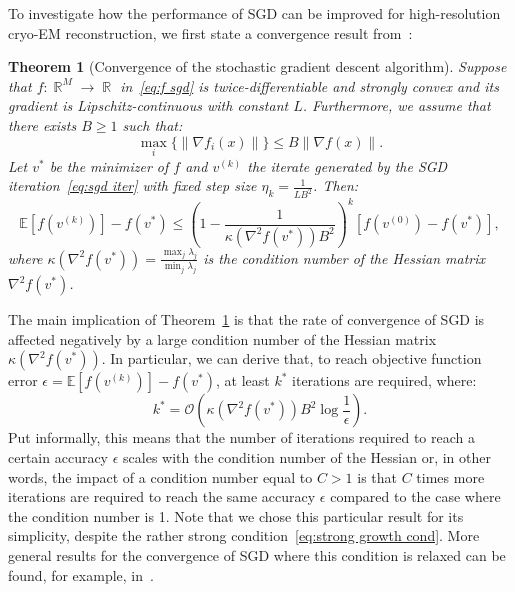 \documentclass{article}
\DeclareMathOperator{\Rb}{\mathbb{R}}
\newtheorem{theorem}{Theorem}[section]
\begin{document}
To investigate how the performance of SGD can be improved for high-resolution
cryo-EM reconstruction, we first state a convergence result from~\cite{schmidt_fast_2013}:
\begin{theorem}[Convergence of the stochastic gradient descent algorithm]
    Suppose that $f: \Rb^M \to \Rb$ in~\eqref{eq:f sgd} is twice-differentiable
    and strongly convex and its gradient is Lipschitz-continuous with constant $L$.
    Furthermore, we assume that there exists $B \geq 1$ such that:
    \begin{equation}
        \max_i \{ \|\nabla f_i(x) \| \} \leq B \| \nabla f(x) \|.
        \label{eq:strong growth cond}
    \end{equation}
    Let $v^*$ be the minimizer of $f$ and $v^{(k)}$ the iterate generated
    by the SGD iteration~\eqref{eq:sgd iter} with fixed step size $\eta_k = \frac{1}{LB^2}$. 
    Then:
    $$
    \mathbb{E}\left[ f(v^{(k)}) \right] - f(v^*) \leq
    \left(1 - \frac{1}{\kappa(\nabla^2 f(v^*)) B^2} \right)^k
    \left[ f(v^{(0)}) - f(v^*)  \right],
    $$
    where $ \kappa(\nabla^2 f(v^*)) = \frac{\max_j \lambda_j}{\min_j \lambda_j}$
    is the condition number of the Hessian matrix $\nabla^2 f(v^*)$. 
    \label{thm:sgd convergence}
\end{theorem}
The main implication of Theorem~\ref{thm:sgd convergence} is that the rate of 
convergence of SGD is affected negatively by a large condition number of the 
Hessian matrix $\kappa(\nabla^2 f(v^*))$.
In particular, we can derive that, 
to reach objective function error 
$\epsilon = \mathbb{E}\left[ f(v^{(k)}) \right] - f(v^*)$,
at least $k^*$ iterations are required, where:
\begin{equation}
    k^* = \mathcal{O}\left(
        \kappa(\nabla^2 f(v^*)) B^2 \log\frac{1}{\epsilon}
    \right).
    \label{eq:min iters}
\end{equation}
Put informally, this means that the number of iterations required to reach a certain accuracy $\epsilon$ scales with the condition number of the Hessian or, in other words, the impact of a condition number equal to $C > 1$ is that $C$ times more iterations are required to reach the same accuracy $\epsilon$ compared to the case where the condition number is 1.
Note that we chose this particular result for its simplicity, despite the rather
strong condition~\eqref{eq:strong growth cond}. More general results for the convergence 
of SGD where this condition is relaxed can be found, for example,  
in~\cite{moulines_non-asymptotic_2011, needell_stochastic_2016, gower_sgd_2019}.
\end{document}
